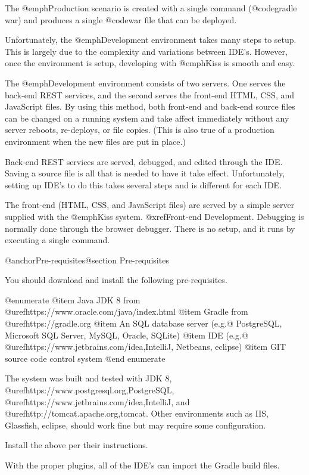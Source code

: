 The @emph{Production} scenario is created with a single command 
(@code{gradle war}) and produces a single @code{war} file that
can be deployed.

Unfortunately, the @emph{Development} environment takes many steps to
setup.  This is largely due to the complexity and variations between
IDE's.  However, once the environment is setup, developing with
@emph{Kiss} is smooth and easy.

The @emph{Development} environment consists of two servers.  One serves
the back-end REST services, and the second serves the front-end HTML, CSS, 
and JavaScript files.  By using this method, both front-end and back-end
source files can be changed on a running system and take affect immediately
without any server reboots, re-deploys, or file copies.  (This is also
true of a production environment when the new files are put in place.)

Back-end REST services are served, debugged, and edited through the IDE.
Saving a source file is all that is needed to have it take effect.
Unfortunately, setting up IDE's to do this takes several steps and is different
for each IDE.

The front-end (HTML, CSS, and JavaScript files) are served by a simple
server supplied with the @emph{Kiss} system.  @xref{Front-end Development}.
Debugging is normally done through the browser debugger.
There is no setup, and it runs by executing a single command.

@anchor{Pre-requisites}@section Pre-requisites

You should download and install the following pre-requisites.

@enumerate
@item
Java JDK 8 from @uref{https://www.oracle.com/java/index.html}
@item
Gradle from @uref{https://gradle.org}
@item
An SQL database server (e.g.@ PostgreSQL, Microsoft SQL Server, MySQL, Oracle, SQLite)
@item
IDE (e.g.@ @uref{https://www.jetbrains.com/idea,IntelliJ}, Netbeans, eclipse)
@item
GIT source code control system
@end enumerate

The system was built and tested with JDK 8, @uref{https://www.postgresql.org,PostgreSQL}, @uref{https://www.jetbrains.com/idea,IntelliJ}, and 
@uref{http://tomcat.apache.org,tomcat}.  Other environments such as IIS, Glassfish, eclipse, should work fine but may require some configuration.

Install the above per their instructions.

With the proper plugins, all of the IDE's can import the Gradle build files.

